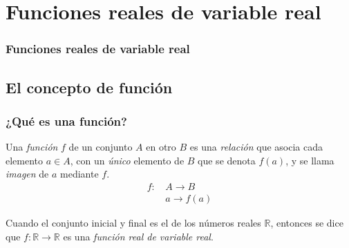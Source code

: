 \section{Funciones reales de variable real}

\begin{frame}
\frametitle{Funciones reales de variable real}
\setlength{\parskip}{0.3em}
\tableofcontents[sectionstyle=show/hide,hideothersubsections]
\end{frame}

\subsection{El concepto de función}

\begin{frame}
\frametitle{¿Qué es una función?}
\begin{definicion}
Una \emph{función} $f$ de un conjunto $A$ en otro $B$ es una \emph{relación} que asocia cada elemento $a\in A$, con un \emph{único} elemento de $B$ que se denota $f(a)$, y se llama \emph{imagen} de $a$ mediante $f$.
\begin{align*}
f:\,&A\longrightarrow B\\
&a\longrightarrow f(a)
\end{align*}
\end{definicion}

\begin{center}
\scalebox{1}{}
\end{center}
Cuando el conjunto inicial y final es el de los números reales $\mathbb{R}$, entonces se dice que 
$f:\mathbb{R}\rightarrow \mathbb{R}$ es una \emph{función real de variable real}.
\end{frame}



